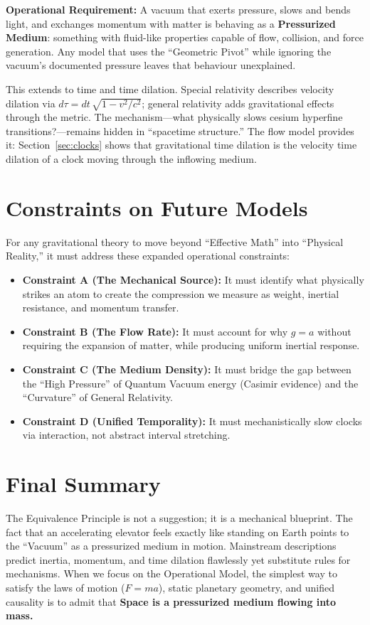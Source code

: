 \documentclass[11pt,a4paper]{article}
\begin{document}
\textbf{Operational Requirement:} A vacuum that exerts pressure, slows and bends light, and exchanges momentum with matter is behaving as a \textbf{Pressurized Medium}: something with fluid-like properties capable of flow, collision, and force generation. Any model that uses the ``Geometric Pivot'' while ignoring the vacuum's documented pressure leaves that behaviour unexplained.

This extends to time and time dilation. Special relativity describes velocity dilation via $d\tau = dt\,\sqrt{1 - v^2/c^2}$; general relativity adds gravitational effects through the metric. The mechanism---what physically slows cesium hyperfine transitions?---remains hidden in ``spacetime structure.'' The flow model provides it: Section~\ref{sec:clocks} shows that gravitational time dilation is the velocity time dilation of a clock moving through the inflowing medium.

\section{Constraints on Future Models}
For any gravitational theory to move beyond ``Effective Math'' into ``Physical Reality,'' it must address these expanded operational constraints:
\begin{itemize}
    \item \textbf{Constraint A (The Mechanical Source):} It must identify what physically strikes an atom to create the compression we measure as weight, inertial resistance, and momentum transfer.
    \item \textbf{Constraint B (The Flow Rate):} It must account for why $g=a$ without requiring the expansion of matter, while producing uniform inertial response.
    \item \textbf{Constraint C (The Medium Density):} It must bridge the gap between the ``High Pressure'' of Quantum Vacuum energy (Casimir evidence) and the ``Curvature'' of General Relativity.
    \item \textbf{Constraint D (Unified Temporality):} It must mechanistically slow clocks via interaction, not abstract interval stretching.
\end{itemize}

\section{Final Summary}
The Equivalence Principle is not a suggestion; it is a mechanical blueprint. The fact that an accelerating elevator feels exactly like standing on Earth points to the ``Vacuum'' as a pressurized medium in motion. Mainstream descriptions predict inertia, momentum, and time dilation flawlessly yet substitute rules for mechanisms. When we focus on the Operational Model, the simplest way to satisfy the laws of motion ($F=ma$), static planetary geometry, and unified causality is to admit that \textbf{Space is a pressurized medium flowing into mass.}
\end{document}
